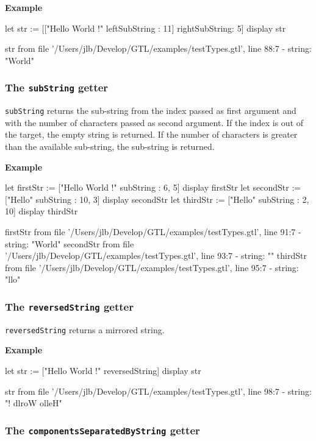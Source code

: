 \documentclass[10pt,openright,twosides]{report}
\newcommand{\gtlarg}[1]{{\footnotesize\ttfamily\colorbox{light-blue}{#1}}}
\newcommand{\gtlinline}[1]{\colorbox{light-blue}{\lstinline[language=gtl]{#1}}}
\newcommand{\example}{\vspace{.75em}\noindent\textbf{Example}\vspace{0em}}
\begin{document}
\example
\begin{gtl}
let str := [["Hello World !" leftSubString : 11] rightSubString: 5]
display str
\end{gtl}
\begin{console}
str from file '/Users/jlb/Develop/GTL/examples/testTypes.gtl', line 88:7
  - string: "World"
\end{console}

\subsubsection{The \texttt{subString} getter}

\gtlinline{subString} returns the sub-string from the \gtlarg{index} passed as first argument and with the \gtlarg{number} of characters passed as second argument. If the \gtlarg{index} is out of the target, the empty string is returned. If the number of characters is greater than the available sub-string, the sub-string is returned. 

\example
\begin{gtl}
let firstStr := ["Hello World !" subString : 6, 5]
display firstStr
let secondStr := ["Hello" subString : 10, 3]
display secondStr
let thirdStr := ["Hello" subString : 2, 10]
display thirdStr
\end{gtl}
\begin{console}
firstStr from file '/Users/jlb/Develop/GTL/examples/testTypes.gtl', line 91:7
  - string: "World"
secondStr from file '/Users/jlb/Develop/GTL/examples/testTypes.gtl', line 93:7
  - string: ""
thirdStr from file '/Users/jlb/Develop/GTL/examples/testTypes.gtl', line 95:7
  - string: "llo"
\end{console}

\subsubsection{The \texttt{reversedString} getter}

\gtlinline{reversedString} returns a mirrored string.

\example
\begin{gtl}
let str := ["Hello World !" reversedString]
display str
\end{gtl}
\begin{console}
str from file '/Users/jlb/Develop/GTL/examples/testTypes.gtl', line 98:7
  - string: "! dlroW olleH"
\end{console}

\subsubsection{The \texttt{componentsSeparatedByString} getter}
\end{document}
